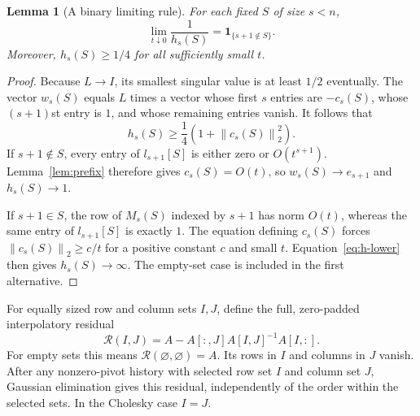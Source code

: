 \documentclass[11pt]{article}
\newtheorem{lemma}[theorem]{Lemma}
\theoremstyle{remark}
\newcommand{\ind}{\mathbf 1}
\newcommand{\norm}[1]{\left\lVert#1\right\rVert}
\begin{document}
\begin{lemma}[A binary limiting rule]\label{lem:h}
For each fixed $S$ of size $s<n$,
\begin{equation}\label{eq:h-indicator}
 \lim_{t\downarrow0}\frac1{h_s(S)}
 =\ind_{\{s+1\notin S\}}.
\end{equation}
Moreover, $h_s(S)\ge1/4$ for all sufficiently small $t$.
\end{lemma}
\begin{proof}
Because $L\to I$, its smallest singular value is at least $1/2$ eventually.
The vector $w_s(S)$ equals $L$ times a vector whose first $s$ entries are
$-c_s(S)$, whose $(s+1)$st entry is $1$, and whose remaining entries vanish.
It follows that
\begin{equation}\label{eq:h-lower}
 h_s(S)\ge\frac14\left(1+\norm{c_s(S)}_2^2\right).
\end{equation}
If $s+1\notin S$, every entry of $l_{s+1}[S]$ is either zero or
$O(t^{s+1})$. Lemma~\ref{lem:prefix} therefore gives $c_s(S)=O(t)$, so
$w_s(S)\to e_{s+1}$ and $h_s(S)\to1$.

If $s+1\in S$, the row of $M_s(S)$ indexed by $s+1$ has norm $O(t)$, whereas
the same entry of $l_{s+1}[S]$ is exactly $1$. The equation defining $c_s(S)$
forces $\norm{c_s(S)}_2\ge c/t$ for a positive constant $c$ and small $t$.
Equation~\eqref{eq:h-lower} then gives $h_s(S)\to\infty$.
The empty-set case is included in the first alternative.
\end{proof}

For equally sized row and column sets $I,J$, define the full, zero-padded
interpolatory residual
\[
 \mathcal R(I,J)=A-A[:,J]A[I,J]^{-1}A[I,:].
\]
For empty sets this means $\mathcal R(\varnothing,\varnothing)=A$.
Its rows in $I$ and columns in $J$ vanish. After any nonzero-pivot history with
selected row set $I$ and column set $J$, Gaussian elimination gives this
residual, independently of the order within the selected sets. In the
Cholesky case $I=J$.
\end{document}
